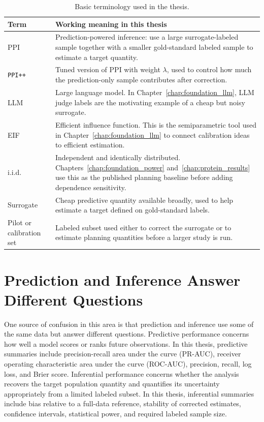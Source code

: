 \begin{table}[h!]
\centering
\small
\setlength{\tabcolsep}{6pt}
\renewcommand{\arraystretch}{1.15}
\begin{tabular}{@{}p{}p{}@{}}
\toprule
Term & Working meaning in this thesis \\
\midrule
PPI & Prediction-powered inference: use a large surrogate-labeled sample together with a smaller gold-standard labeled sample to estimate a target quantity. \\
\texttt{PPI++} & Tuned version of PPI with weight $\lambda$, used to control how much the prediction-only sample contributes after correction. \\
LLM & Large language model. In Chapter~\ref{chap:foundation_llm}, LLM judge labels are the motivating example of a cheap but noisy surrogate. \\
EIF & Efficient influence function. This is the semiparametric tool used in Chapter~\ref{chap:foundation_llm} to connect calibration ideas to efficient estimation. \\
i.i.d. & Independent and identically distributed. Chapters~\ref{chap:foundation_power} and~\ref{chap:protein_results} use this as the published planning baseline before adding dependence sensitivity. \\
Surrogate & Cheap predictive quantity available broadly, used to help estimate a target defined on gold-standard labels. \\
Pilot or calibration set & Labeled subset used either to correct the surrogate or to estimate planning quantities before a larger study is run. \\
\bottomrule
\end{tabular}
\caption[Basic terminology used in the thesis.]{Basic terminology used in the thesis.}
\label{tab:intro_terminology}
\end{table}

\section{Prediction and Inference Answer Different Questions}

One source of confusion in this area is that prediction and inference use some of the same data but answer different questions. Predictive performance concerns how well a model scores or ranks future observations. In this thesis, predictive summaries include precision-recall area under the curve (PR-AUC), receiver operating characteristic area under the curve (ROC-AUC), precision, recall, log loss, and Brier score. Inferential performance concerns whether the analysis recovers the target population quantity and quantifies its uncertainty appropriately from a limited labeled subset. In this thesis, inferential summaries include bias relative to a full-data reference, stability of corrected estimates, confidence intervals, statistical power, and required labeled sample size.

